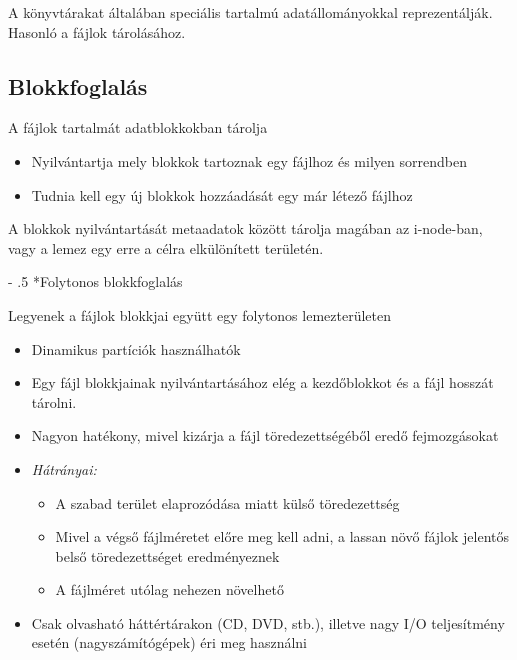 \documentclass[tikz,12pt,margin=0px]{article}
\makeatletter
\renewcommand\paragraph{%
	\@startsection{paragraph}{4}{0mm}%
	{-\baselineskip}%
	{.5\baselineskip}%
	{\normalfont\normalsize\bfseries}}
\makeatother
\begin{document}
    \noindent A könyvtárakat általában speciális tartalmú adatállományokkal reprezentálják. Hasonló a fájlok tárolásához.\\

    \subsection*{Blokkfoglalás}

    \noindent A fájlok tartalmát adatblokkokban tárolja
    \begin{itemize}[topsep=8pt,itemsep=4pt,partopsep=4pt, parsep=4pt]
      \item Nyilvántartja mely blokkok tartoznak egy fájlhoz és milyen sorrendben
      \item Tudnia kell egy új blokkok hozzáadását egy már létező fájlhoz
    \end{itemize}

    \noindent A blokkok nyilvántartását metaadatok között tárolja magában az i-node-ban, vagy a lemez egy erre a célra elkülönített területén.

    \paragraph*{Folytonos blokkfoglalás}

    Legyenek a fájlok blokkjai együtt egy folytonos lemezterületen
    \begin{itemize}[topsep=8pt,itemsep=4pt,partopsep=4pt, parsep=4pt]
      \item Dinamikus partíciók használhatók
      \item Egy fájl blokkjainak nyilvántartásához elég a kezdőblokkot és a fájl hosszát tárolni.
      \item Nagyon hatékony, mivel kizárja a fájl töredezettségéből eredő fejmozgásokat
      \item \emph{Hátrányai:}
      \begin{itemize}
        \item A szabad terület elaprozódása miatt külső töredezettség
        \item Mivel a végső fájlméretet előre meg kell adni, a lassan növő fájlok jelentős belső töredezettséget eredményeznek
        \item A fájlméret utólag nehezen növelhető
      \end{itemize}
      \item Csak olvasható háttértárakon (CD, DVD, stb.), illetve nagy I/O teljesítmény esetén (nagyszámítógépek) éri meg használni
    \end{itemize}
\end{document}
